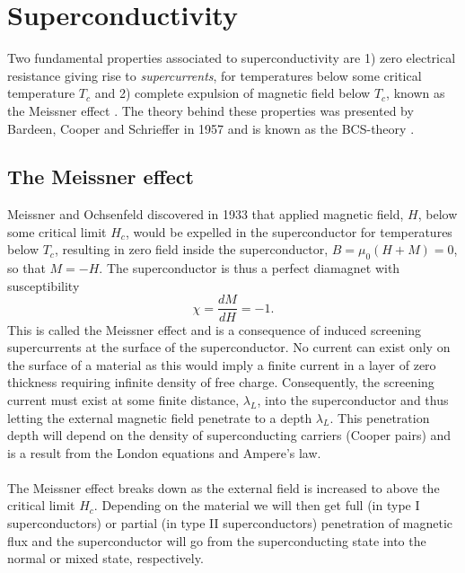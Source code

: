 \chapter{Superconductivity}

Two fundamental properties associated to superconductivity are 1) zero electrical resistance giving rise to \textit{supercurrents}, for temperatures below some critical temperature $T_c$ and 2) complete expulsion of magnetic field below $T_c$, known as the Meissner effect \cite{Meissner33,MeissnerTrans83}. The theory behind these properties was presented by Bardeen, Cooper and Schrieffer in 1957 and is known as the BCS-theory \cite{BCS57}. 


\section{The Meissner effect}\label{sec:meissner}
Meissner and Ochsenfeld discovered in 1933 \cite{Meissner33} that applied magnetic field, $H$, below some critical limit $H_c$, would be expelled in the superconductor for temperatures below $T_c$, resulting in zero field inside the superconductor, $B=\mu_0(H + M)=0$, so that $M=-H$. The superconductor is thus a perfect diamagnet with susceptibility 
\begin{equation}
    \chi = \frac{dM}{dH} = -1.
\end{equation}
This is called the Meissner effect and is a consequence of induced screening supercurrents at the surface of the superconductor. No current can exist only on the surface of a material as this would imply a finite current in a layer of zero thickness requiring infinite density of free charge. Consequently, the screening current must exist at some finite distance, $\lambda_L$, into the superconductor and thus letting the external magnetic field penetrate to a depth $\lambda_L$. This penetration depth will depend on the density of superconducting carriers (Cooper pairs) and is a result from the London equations \cite{London71} and Ampere's law.
\\
\\
The Meissner effect breaks down as the external field is increased to above the critical limit $H_c$. Depending on the material we will then get full (in type I superconductors) or partial (in type II superconductors) penetration of magnetic flux and the superconductor will go from the superconducting state into the normal or mixed state, respectively.

